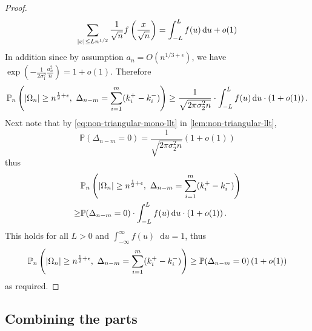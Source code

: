 \documentclass[draft]{scrartcl}
\newcommand{\littleo}{o}
\newcommand{\bigo}{O}
\DeclarePairedDelimiter{\abs}{\lvert}{\rvert}
\newcommand*\dif{\mathop{}\!\mathrm{d}}
\begin{document}
\begin{proof}
    \begin{equation}
        \sum_{\abs{x} \leq Ln^{1/2}} \frac{1}{\sqrt{n}} f\left( \frac{x}{\sqrt{n}} \right) = \int_{-L}^L f(u) \dif u + \littleo(1)
    \end{equation}    
    In addition since by assumption $a_n = \bigo(n^{1/3 + \epsilon})$, we have $\exp \left( - \frac{1}{2 \sigma_1^2} \frac{a_n^2}{n}\right) = 1 + \littleo(1)$. Therefore
    \begin{align}
        \mathbb P_n \left( \abs{\Omega_n} \geq n^{\frac{1}{2} + \epsilon},\ \Delta_{n-m} = \sum_{i=1}^m (k_i^+ - k_i^-) \right) 
        \geq \frac{1}{\sqrt{2 \pi \sigma_2^2 n}} \cdot \int_{-L}^L f(u) \dif u \cdot \left( 1 + \littleo(1) \right).
    \end{align}
    Next note that by \cref{eq:non-triangular-mono-llt} in \cref{lem:non-triangular-llt},
    \begin{equation}
        \mathbb P \left( \Delta_{n-m} = 0 \right) = \frac{1}{\sqrt{2 \pi \sigma_2^2 n}}  (1 + \littleo(1))
    \end{equation}
    thus
    \begin{align}
        &\mathbb P_n \left( \abs{\Omega_n} \geq n^{\frac{1}{2} + \epsilon},\ \Delta_{n-m} = \sum_{i=1}^m (k_i^+ - k_i^-) \right) \\
        \geq& \mathbb P(\Delta_{n-m} = 0) \cdot \int_{-L}^L f(u) \dif u \cdot \left( 1 + \littleo(1) \right).
    \end{align}
    This holds for all $L > 0$ and $\int_{-\infty}^{\infty} f(u) \dif u = 1$, thus
    \begin{align}
        \mathbb P_n \left( \abs{\Omega_n} \geq n^{\frac{1}{2} + \epsilon},\ \Delta_{n-m} = \sum_{i=1}^m (k_i^+ - k_i^-) \right)
        \geq \mathbb P(\Delta_{n-m} = 0) \left( 1 + \littleo(1) \right)
    \end{align}
    as required.
\end{proof}

\subsection{Combining the parts}
\end{document}
